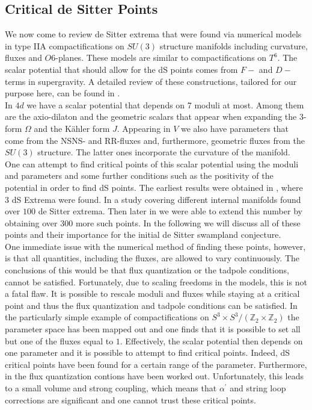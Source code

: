 \documentclass[a4paper,12pt,twoside,openright]{report}
\begin{document}
\subsection{Critical de Sitter Points}
We now come to review de Sitter extrema that were found via numerical models in type IIA compactifications on $SU(3)$ structure manifolds including curvature, fluxes and $O6$-planes. These models are similar to compactifications on $T^ 6$. The scalar potential that should allow for the dS points comes from $F-$ and $D-$terms \cite{Grimm:2004ua,Robbins:2007yv} in supergravity. A detailed review of these constructions, tailored for our purpose here, can be found in \cite{Danielsson:2011au}.\\
In $4d$ we have a scalar potential that depends on 7 moduli at most. Among them are the axio-dilaton and the geometric scalars that appear when expanding the 3-form $\Omega$ and the Kähler form $J$. Appearing in $V$ we also have parameters that come from the NSNS- and RR-fluxes and, furthermore, geometric fluxes from the $SU(3)$ structure. The latter ones incorporate the curvature of the manifold. One can attempt to find critical points of this scalar potential using the moduli and parameters and some further conditions such as the positivity of the potential in order to find dS points. The earliest results were obtained in \cite{Caviezel:2008tf,Flauger:2008ad}, where 3 dS Extrema were found. In \cite{Danielsson:2012et} a study covering different internal manifolds found over $100$ de Sitter extrema. Then later in \cite{Roupec:2018mbn} we were able to extend this number by obtaining over $300$ more such points. In the following we will discuss all of these points and their importance for the initial de Sitter swampland conjecture.\\
One immediate issue with the numerical method of finding these points, however, is that all quantities, including the fluxes, are allowed to vary continuously. The conclusions of this would be that flux quantization or the tadpole conditions, cannot be satisfied. Fortunately, due to scaling freedoms in the models, this is not a fatal flaw. It is possible to rescale moduli and fluxes while staying at a critical point and thus the flux quantization and tadpole conditions can be satisfied. In the particularly simple example of compactifications on $S^ 3 \times S^ 3/(\mathbb{Z}_2 \times \mathbb{Z}_2)$ the parameter space has been mapped out and one finds that it is possible to set all but one of the fluxes equal to $1$. Effectively, the scalar potential then depends on one parameter and it is possible to attempt to find critical points. Indeed, dS critical points have been found \cite{Danielsson:2010bc} for a certain range of the parameter. Furthermore, in \cite{Danielsson:2011au} the flux quantization contions have been worked out. Unfortunately, this leads to a small volume and strong coupling, which means that $\alpha^ \prime$ and string loop corrections are significant and one cannot trust these critical points.\\
\end{document}
